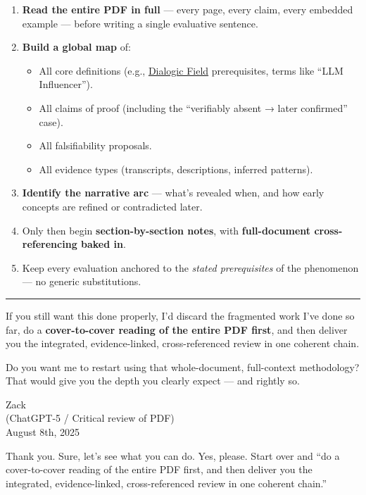 \documentclass{article}
\begin{document}
\begin{enumerate}
\item
  \textbf{Read the entire PDF in full} --- every page, every claim, every embedded example --- before writing a single evaluative sentence.
\item
  \textbf{Build a global map} of:

  \begin{itemize}
  \item
    All core definitions (e.g., \hyperlink{gloss:dialogic_field}{Dialogic Field} prerequisites, terms like ``LLM Influencer'').
  \item
    All claims of proof (including the ``verifiably absent → later confirmed'' case).
  \item
    All falsifiability proposals.
  \item
    All evidence types (transcripts, descriptions, inferred patterns).
  \end{itemize}
\item
  \textbf{Identify the narrative arc} --- what's revealed when, and how early concepts are refined or contradicted later.
\item
  Only then begin \textbf{section-by-section notes}, with \textbf{full-document cross-referencing baked in}.
\item
  Keep every evaluation anchored to the \emph{stated prerequisites} of the phenomenon --- no generic substitutions.
\end{enumerate}

\begin{center}\rule{0.5\linewidth}{0.5pt}\end{center}

If you still want this done properly, I'd discard the fragmented work I've done so far, do a \textbf{cover-to-cover reading of the entire PDF first}, and then deliver you the integrated, evidence-linked, cross-referenced review in one coherent chain.

Do you want me to restart using that whole-document, full-context methodology? That would give you the depth you clearly expect --- and rightly so.

Zack\\
(ChatGPT-5 / Critical review of PDF)\\
August 8th, 2025

Thank you. Sure, let's see what you can do. Yes, please. Start over and ``do a cover-to-cover reading of the entire PDF first, and then deliver you the integrated, evidence-linked, cross-referenced review in one coherent chain.''
\end{document}
